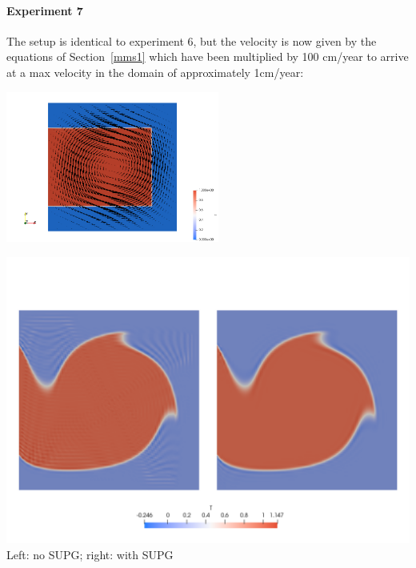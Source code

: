 \paragraph{Experiment 7}

The setup is identical to experiment 6, but the velocity is now given by 
the equations of Section~\ref{mms1} which have been multiplied by 100 cm/year 
to arrive at a max velocity in the domain of approximately 1cm/year:

\begin{center}
\includegraphics[width=7cm]{python_codes/fieldstone_43/results/experiment7/setup}
\end{center}

\begin{center}
\includegraphics[width=14cm]{python_codes/fieldstone_43/results/experiment7/T}\\
{\captionfont Left: no SUPG; right: with SUPG}
\end{center}


